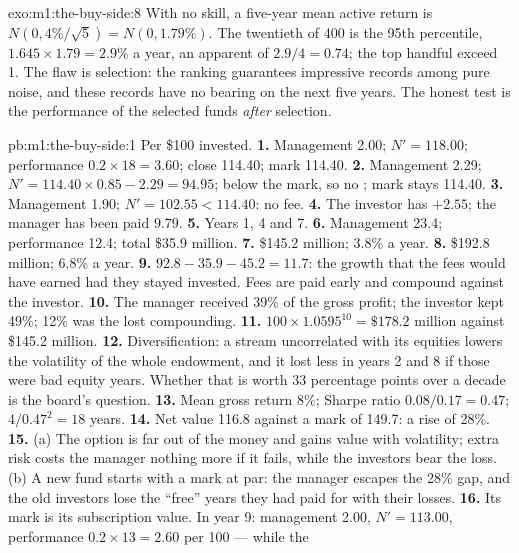 \begin{solution}{exo:m1:the-buy-side:8}
With no skill, a five-year mean active return is $N(0, 4\%/\sqrt5) = N(0,
1.79\%)$. The twentieth of 400 is the 95th percentile, $1.645 \times 1.79 =
2.9\%$ a year, an apparent  of $2.9/4 = 0.74$; the top
handful exceed 1. The flaw is selection: the ranking guarantees impressive
records among pure noise, and these records have no bearing on the next five
years. The honest test is the performance of the selected funds
\emph{after} selection.
\end{solution}

\begin{solution}{pb:m1:the-buy-side:1}
Per \$100 invested.
\textbf{1.} Management 2.00; $N' = 118.00$; performance $0.2 \times 18 = 3.60$;
close 114.40; mark 114.40.
\textbf{2.} Management 2.29; $N' = 114.40\times0.85 - 2.29 = 94.95$; below
the mark, so no ; mark stays 114.40.
\textbf{3.} Management 1.90; $N' = 102.55 < 114.40$: no fee.
\textbf{4.} The investor has $+2.55$; the manager has been paid $9.79$.
\textbf{5.} Years 1, 4 and 7.
\textbf{6.} Management 23.4; performance 12.4; total \$35.9 million.
\textbf{7.} \$145.2 million; 3.8\% a year.
\textbf{8.} \$192.8 million; 6.8\% a year.
\textbf{9.} $92.8 - 35.9 - 45.2 = 11.7$: the growth that the fees would have
earned had they stayed invested. Fees are paid early and compound against
the investor.
\textbf{10.} The manager received 39\% of the gross profit; the investor
kept 49\%; 12\% was the lost compounding.
\textbf{11.} $100 \times 1.0595^{10} = \$178.2$ million against \$145.2
million.
\textbf{12.} Diversification: a stream uncorrelated with its equities lowers
the volatility of the whole endowment, and it lost less in years 2 and 8 if
those were bad equity years. Whether that is worth 33 percentage points over
a decade is the board's question.
\textbf{13.} Mean gross return 8\%; Sharpe ratio $0.08/0.17 = 0.47$;
$4/0.47^2 = 18$ years.
\textbf{14.} Net value 116.8 against a mark of 149.7: a rise of 28\%.
\textbf{15.} (a) The option is far out of the money and gains value with
volatility; extra risk costs the manager nothing more if it fails, while
the investors bear the loss. (b) A new fund starts with a mark at par: the
manager escapes the 28\% gap, and the old investors lose the ``free'' years
they had paid for with their losses.
\textbf{16.} Its mark is its subscription value. In year 9: management 2.00,
$N' = 113.00$, performance $0.2 \times 13 = 2.60$ per 100 --- while the

\end{solution}
